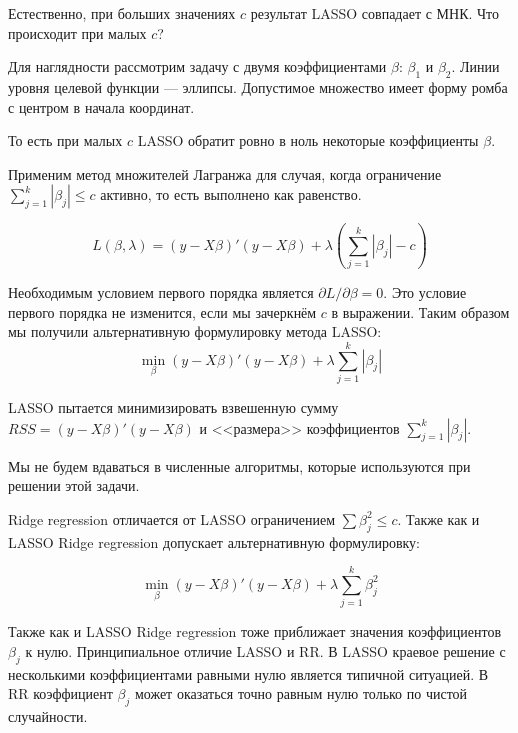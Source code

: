 \documentclass[pdftex,12pt,a4paper]{article}
\begin{document}
Естественно, при больших значениях $c$ результат LASSO совпадает с МНК. Что происходит при малых $c$?


Для наглядности рассмотрим задачу с двумя коэффициентами $\beta$: $\beta_1$ и $\beta_2$. Линии уровня целевой функции --- эллипсы. Допустимое множество имеет форму ромба с центром в начала координат.




То есть при малых $c$ LASSO обратит ровно в ноль некоторые коэффициенты $\beta$.


Применим метод множителей Лагранжа для случая, когда ограничение $\sum_{j=1}^{k}|\beta_j|\leq c$ активно, то есть выполнено как равенство. 

\begin{equation}
L(\beta,\lambda)=(y-X\beta)'(y-X\beta)+\lambda \left(\sum_{j=1}^{k}|\beta_j| - c \right)
\end{equation}

Необходимым условием первого порядка является $\partial L/\partial \beta =0$. 
Это условие первого порядка не изменится, если мы зачеркнём $c$ в выражении. 
Таким образом мы получили альтернативную формулировку метода LASSO:
\begin{equation}
\min_{\beta} (y-X\beta)'(y-X\beta)+\lambda \sum_{j=1}^{k}|\beta_j|
\end{equation}

LASSO пытается минимизировать взвешенную сумму $RSS=(y-X\beta)'(y-X\beta)$ и <<размера>> коэффициентов $\sum_{j=1}^{k}|\beta_j|$.


Мы не будем вдаваться в численные алгоритмы, которые используются при решении этой задачи.


Ridge regression отличается от LASSO ограничением $\sum \beta_j^2\leq c$. 
Также как и LASSO Ridge regression допускает альтернативную формулировку:

\begin{equation}
\min_{\beta} (y-X\beta)'(y-X\beta)+\lambda \sum_{j=1}^{k} \beta_j^2
\end{equation}

Также как и LASSO Ridge regression тоже приближает значения коэффициентов $\beta_j$ к нулю. 
Принципиальное отличие LASSO и RR. 
В LASSO краевое решение с несколькими коэффициентами равными нулю является типичной ситуацией. 
В RR коэффициент $\beta_j$ может оказаться точно равным нулю только по чистой случайности. 
\end{document}
